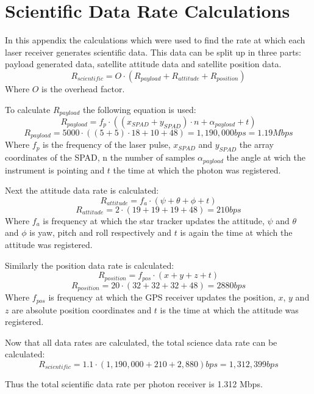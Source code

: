 \chapter{Scientific Data Rate Calculations}
\label{scirate}
In this appendix the calculations which were used to find the rate at which each laser receiver generates scientific data.
This data can be split up in three parts: payload generated data, satellite attitude data and satellite position data.
\begin{equation}
R_{scientific}=O\cdot (R_{payload}+ R_{attitude} + R_{position})
\end{equation}
Where $O$ is the overhead factor.

To calculate $R_{payload}$ the following equation is used:
\begin{equation}
R_{payload}=f_{p} \cdot ((x_{SPAD}+y_{SPAD})\cdot n+ \alpha_{payload}+t)
\end{equation}
\begin{equation}
R_{payload}=5000 \cdot ((5+5)\cdot 18+10+48)=1,190,000 bps=1.19 Mbps 
\end{equation}
Where $f_{p}$ is the frequency of the laser pulse, $x_{SPAD}$ and $y_{SPAD}$ the array coordinates of the SPAD, n the number of samples $\alpha_{payload}$ the angle at wich the instrument is pointing and $t$ the time at which the photon was registered.

Next the attitude data rate is calculated:
\begin{equation}
R_{attitude}=f_{a} \cdot (\psi + \theta + \phi +t)
\end{equation}
\begin{equation}
R_{attitude}=2 \cdot (19+19+19+48)=210 bps 
\end{equation}
Where $f_{a}$ is frequency at which the star tracker updates the attitude, $\psi$ and $\theta$ and $\phi$ is yaw, pitch and roll respectively and $t$ is again the time at which the attitude was registered.

Similarly the position data rate is calculated:
\begin{equation}
R_{position}=f_{pos} \cdot (x + y + z +t)
\end{equation}
\begin{equation}
R_{position}=20 \cdot (32+32+32+48)=2880 bps 
\end{equation}
Where $f_{pos}$ is frequency at which the GPS receiver updates the position, $x$, $y$ and $z$ are absolute position coordinates and $t$ is the time at which the attitude was registered.

Now that all data rates are calculated, the total science data rate can be calculated:
\begin{equation}
R_{scientific}=1.1\cdot (1,190,000 + 210 + 2,880) bps= 1,312,399 bps
\end{equation}

Thus the total scientific data rate per photon receiver is 1.312 Mbps.